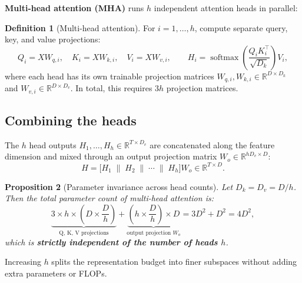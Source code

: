 \documentclass[11pt,a4paper]{article}
\newcommand{\R}{\mathbb{R}}
\DeclareMathOperator{\softmax}{softmax}
\newcommand{\slides}[1]{\par\nopagebreak\noindent{\normalfont\small\emph{(slides #1)}}\par\nopagebreak\vspace{2pt}}
\theoremstyle{definition}
\newtheorem{definition}{Definition}[section]
\theoremstyle{plain}
\newtheorem{proposition}[definition]{Proposition}
\begin{document}
\textbf{Multi-head attention (MHA)} runs $h$ independent attention heads in parallel:
\begin{definition}[Multi-head attention]
For $i = 1, \dots, h$, compute separate query, key, and value projections:
\begin{equation}
Q_i = X W_{q,i}, \quad K_i = X W_{k,i}, \quad V_i = X W_{v,i}, \qquad H_i = \softmax\left( \frac{Q_i K_i^\top}{\sqrt{D_k}} \right) V_i,
\end{equation}
where each head has its own trainable projection matrices $W_{q,i}, W_{k,i} \in \R^{D \times D_k}$ and $W_{v,i} \in \R^{D \times D_v}$. In total, this requires $3h$ projection matrices.
\end{definition}

\subsection{Combining the heads}\slides{38 / 84}
The $h$ head outputs $H_1, \dots, H_h \in \R^{T \times D_v}$ are concatenated along the feature dimension and mixed through an output projection matrix $W_o \in \R^{h D_v \times D}$:
\begin{equation}
H = \big[ H_1 \;\|\; H_2 \;\|\; \cdots \;\|\; H_h \big] W_o \in \R^{T \times D}.
\end{equation}
\begin{proposition}[Parameter invariance across head counts]
Let $D_k = D_v = D/h$. Then the total parameter count of multi-head attention is:
\begin{equation}
\underbrace{3 \times h \times \left( D \times \frac{D}{h} \right)}_{\text{Q, K, V projections}} + \underbrace{\left( h \times \frac{D}{h} \right) \times D}_{\text{output projection } W_o} = 3 D^2 + D^2 = 4 D^2,
\end{equation}
which is \textbf{strictly independent of the number of heads $h$}.
\end{proposition}
Increasing $h$ splits the representation budget into finer subspaces without adding extra parameters or FLOPs.
\end{document}
